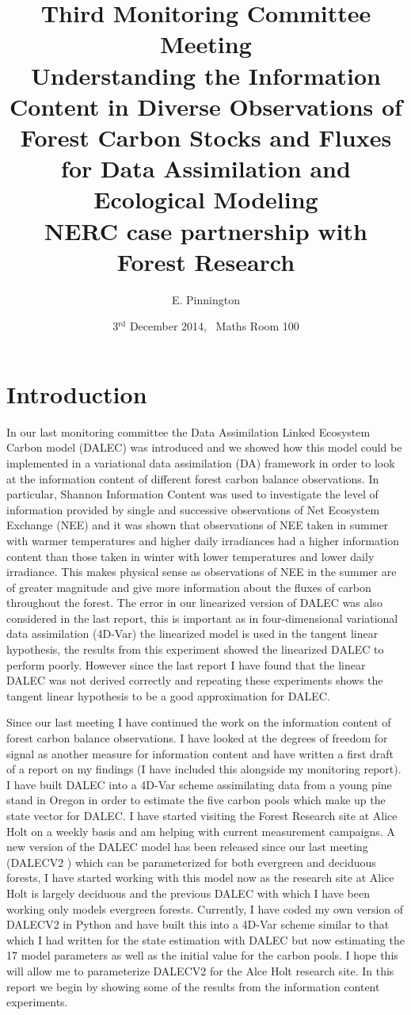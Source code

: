 \documentclass[11pt]{article}
\title{Third Monitoring Committee Meeting\\\vspace{4mm} \normalsize{Understanding the Information Content in Diverse Observations of Forest Carbon Stocks and Fluxes for Data Assimilation and Ecological Modeling\\ NERC case partnership with Forest Research}}
\date{\normalsize{3$^{\text{rd}}$ December 2014, \ Maths Room 100}}
\author{\normalsize{E. Pinnington}}
\begin{document}
\maketitle

\section{Introduction}

In our last monitoring committee the Data Assimilation Linked Ecosystem Carbon model (DALEC) \cite{williams2005improved} was introduced and we showed how this model could be implemented in a variational data assimilation (DA) framework in order to look at the information content of different forest carbon balance observations. In particular, Shannon Information Content \cite{rodgers2000inverse} was used to investigate the level of information provided by single and successive observations of Net Ecosystem Exchange (NEE) and it was shown that observations of NEE taken in summer with warmer temperatures and higher daily irradiances had a higher information content than those taken in winter with lower temperatures and lower daily irradiance. This makes physical sense as observations of NEE in the summer are of greater magnitude and give more information about the fluxes of carbon throughout the forest. The error in our linearized version of DALEC was also considered in the last report, this is important as in four-dimensional variational data assimilation (4D-Var) the linearized model is used in the tangent linear hypothesis, the results from this experiment showed the linearized DALEC to perform poorly. However since the last report I have found that the linear DALEC was not derived correctly and repeating these experiments shows the tangent linear hypothesis to be a good approximation for DALEC. 

Since our last meeting I have continued the work on the information content of forest carbon balance observations. I have looked at the degrees of freedom for signal as another measure for information content and have written a first draft of a report on my findings (I have included this alongside my monitoring report). I have built DALEC into a 4D-Var scheme assimilating data from a young pine stand in Oregon in order to estimate the five carbon pools which make up the state vector for DALEC. I have started visiting the Forest Research site at Alice Holt on a weekly basis and am helping with current measurement campaigns. A new version of the DALEC model has been released since our last meeting (DALECV2 \cite{Bloom2014}) which can be parameterized for both evergreen and deciduous forests, I have started working with this model now as the research site at Alice Holt is largely deciduous and the previous DALEC with which I have been working only models evergreen forests. Currently, I have coded my own version of DALECV2 in Python and have built this into a 4D-Var scheme similar to that which I had written for the state estimation with DALEC but now estimating the 17 model parameters as well as the initial value for the carbon pools. I hope this will allow me to parameterize DALECV2 for the Alce Holt research site. In this report we begin by showing some of the results from the information content experiments.
\end{document}
